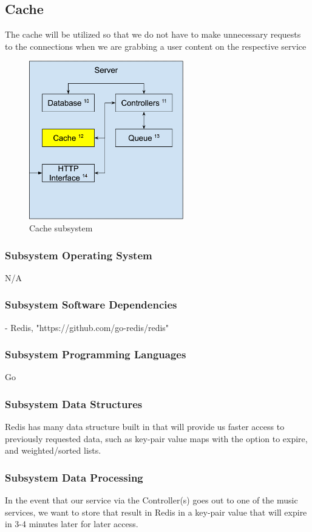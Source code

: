 \subsection{Cache}
The cache will be utilized so that we do not have to make unnecessary requests to the connections when we are grabbing a user content on the respective service

\begin{figure}[h!]
	\centering
 	\includegraphics[width=0.60\textwidth]{images/server/server_cache.png}
 	\caption{Cache subsystem}
\end{figure}

\subsubsection{Subsystem Operating System}
N/A
\subsubsection{Subsystem Software Dependencies}
- Redis, "https://github.com/go-redis/redis" \\

\subsubsection{Subsystem Programming Languages}
Go
\subsubsection{Subsystem Data Structures}
Redis has many data structure built in that will provide us faster access to previously requested data, such as key-pair value maps with the option to expire, and weighted/sorted lists.
\subsubsection{Subsystem Data Processing}
In the event that our service via the Controller(s) goes out to one of the music services, we want to store that result in Redis in a key-pair value that will expire in 3-4 minutes later for later access.
\newpage
